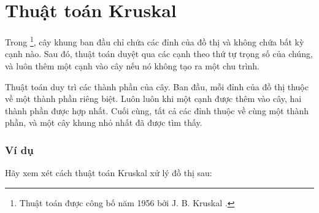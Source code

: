 \section{Thuật toán Kruskal}


Trong \footnote{Thuật toán được công bố năm 1956
bởi J. B. Kruskal \cite{kru56}.}, cây khung ban đầu
chỉ chứa các đỉnh của đồ thị
và không chứa bất kỳ cạnh nào.
Sau đó, thuật toán duyệt qua các cạnh
theo thứ tự trọng số của chúng, và luôn thêm một cạnh
vào cây nếu nó không tạo ra một chu trình.

Thuật toán duy trì các thành phần
của cây.
Ban đầu, mỗi đỉnh của đồ thị
thuộc về một thành phần riêng biệt.
Luôn luôn khi một cạnh được thêm vào cây,
hai thành phần được hợp nhất.
Cuối cùng, tất cả các đỉnh thuộc về cùng một thành phần,
và một cây khung nhỏ nhất đã được tìm thấy.

\subsubsection{Ví dụ}

\begin{samepage}
Hãy xem xét cách thuật toán Kruskal xử lý
đồ thị sau:
\begin{center}
\end{center}
\end{samepage}

